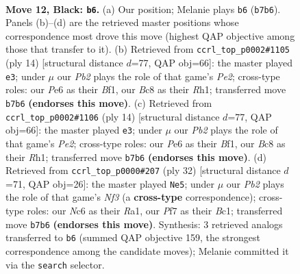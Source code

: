 \documentclass[11pt]{article}
\begin{document}
\clearpage

\begin{figure}[p]\centering
\begin{subfigure}{0.46\textwidth}\centering
\resizebox{\linewidth}{!}{%
\newchessgame
\chessboard[
  setfen={r1b2r2/ppppqppk/2n1pn2/2P4p/Q2P4/2B2NP1/PP1KPP1P/R4B1R b - - 2 12},
  showmover=false,
  pgfstyle=straightmove, color=movearrow, markmove={b7-b6}
]}
\caption{}
\end{subfigure}\hfill
\begin{subfigure}{0.46\textwidth}\centering
\resizebox{\linewidth}{!}{%
\newchessgame
\chessboard[
  setfen={r1b1kb1r/pp1n1pp1/2p1pq1p/3p4/2PP4/2N2N2/PPQ1PPPP/R3KB1R w KQkq - 2 8},
  showmover=false,
  pgfstyle=straightmove, color=movearrow, markmove={e2-e3}
]}
\caption{}
\end{subfigure}
\\[4pt]
\begin{subfigure}{0.46\textwidth}\centering
\resizebox{\linewidth}{!}{%
\newchessgame
\chessboard[
  setfen={r1b1kb1r/pp1n1pp1/2p1pq1p/3p4/2PP4/2N2N2/PPQ1PPPP/R3KB1R w KQkq - 2 8},
  showmover=false,
  pgfstyle=straightmove, color=movearrow, markmove={e2-e3}
]}
\caption{}
\end{subfigure}\hfill
\begin{subfigure}{0.46\textwidth}\centering
\resizebox{\linewidth}{!}{%
\newchessgame
\chessboard[
  setfen={r3kb1r/1bq2ppp/p3pn2/3p4/1PpP4/P1N2N2/1P3PPP/R1BQR1K1 w kq - 0 17},
  showmover=false,
  pgfstyle=straightmove, color=movearrow, markmove={f3-e5}
]}
\caption{}
\end{subfigure}
\caption{\textbf{Move 12, Black: \texttt{b6}.} (a) Our position; Melanie plays \texttt{b6} (\texttt{b7b6}). Panels (b)--(d) are the retrieved master positions whose correspondence most drove this move (highest QAP objective among those that transfer to it). (b) Retrieved from \texttt{ccrl\_top\_p0002\#1105} (ply 14) [structural distance $d$=77, QAP obj=66]: the master played \texttt{e3}; under $\mu$ our \emph{Pb2} plays the role of that game's \emph{Pe2}; cross-type roles: our \emph{P}e6 as their \emph{B}f1, our \emph{B}c8 as their \emph{R}h1; transferred move \texttt{b7b6} \textbf{(endorses this move)}. (c) Retrieved from \texttt{ccrl\_top\_p0002\#1106} (ply 14) [structural distance $d$=77, QAP obj=66]: the master played \texttt{e3}; under $\mu$ our \emph{Pb2} plays the role of that game's \emph{Pe2}; cross-type roles: our \emph{P}e6 as their \emph{B}f1, our \emph{B}c8 as their \emph{R}h1; transferred move \texttt{b7b6} \textbf{(endorses this move)}. (d) Retrieved from \texttt{ccrl\_top\_p0000\#207} (ply 32) [structural distance $d$=71, QAP obj=26]: the master played \texttt{Ne5}; under $\mu$ our \emph{Pb2} plays the role of that game's \emph{Nf3} (a \textbf{cross-type} correspondence); cross-type roles: our \emph{N}c6 as their \emph{R}a1, our \emph{P}f7 as their \emph{B}c1; transferred move \texttt{b7b6} \textbf{(endorses this move)}. Synthesis: 3 retrieved analogs transferred to \texttt{b6} (summed QAP objective 159, the strongest correspondence among the candidate moves); Melanie committed it via the \texttt{search} selector.}
\label{fig:thought-m23}
\end{figure}
\end{document}
